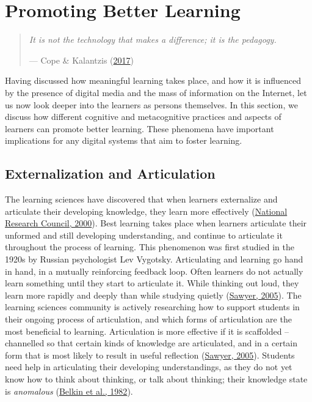 \documentclass[letterpaper, nobind]{templates/ociamthesis}
\begin{document}
\hypertarget{sec-bg-learn-promoting-learning}{%
\section{Promoting Better Learning}\label{sec-bg-learn-promoting-learning}}

\begin{quote}
\emph{It is not the technology that makes a difference; it is the pedagogy.}

\hfill --- Cope \& Kalantzis (\protect\hyperlink{ref-cope2017elearningc}{2017})
\end{quote}

Having discussed how meaningful learning takes place, and how it is
influenced by the presence of digital media and the mass of information
on the Internet, let us now look deeper into the learners as persons
themselves. In this section, we discuss how different cognitive and
metacognitive practices and aspects of learners can promote better
learning. These phenomena have important implications for any digital
systems that aim to foster learning.

\hypertarget{sec-bg-learn-articulation}{%
\subsection{Externalization and Articulation}\label{sec-bg-learn-articulation}}

The learning sciences have discovered that when learners externalize and
articulate their developing knowledge, they learn more effectively
(\protect\hyperlink{ref-council2000how}{National Research Council, 2000}). Best learning takes place when learners articulate
their unformed and still developing understanding, and continue to
articulate it throughout the process of learning. This phenomenon was
first studied in the 1920s by Russian psychologist Lev Vygotsky.
Articulating and learning go hand in hand, in a mutually reinforcing
feedback loop. Often learners do not actually learn something until they
start to articulate it. While thinking out loud, they learn more rapidly
and deeply than while studying quietly (\protect\hyperlink{ref-sawyer2005cambridge}{Sawyer, 2005}). The
learning sciences community is actively researching how to support
students in their ongoing process of articulation, and which forms of
articulation are the most beneficial to learning. Articulation is more
effective if it is scaffolded -- channelled so that certain kinds of
knowledge are articulated, and in a certain form that is most likely to
result in useful reflection (\protect\hyperlink{ref-sawyer2005cambridge}{Sawyer, 2005}). Students need help
in articulating their developing understandings, as they do not yet know
how to think about thinking, or talk about thinking; their knowledge
state is \emph{anomalous} (\protect\hyperlink{ref-belkin1982ask}{Belkin et al., 1982}).
\end{document}
